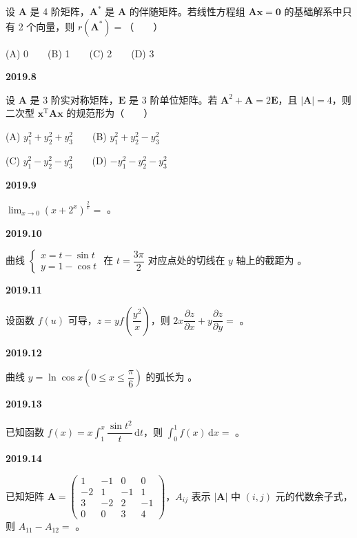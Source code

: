 \documentclass[UTF8,12pt,fontset=windows]{ctexart}
\begin{document}
设 $\boldsymbol{A}$ 是 4 阶矩阵，$\boldsymbol{A}^*$ 是 $\boldsymbol{A}$ 的伴随矩阵。若线性方程组 $\boldsymbol{A}\boldsymbol{x} = \boldsymbol{0}$ 的基础解系中只有 2 个向量，则 $r(\boldsymbol{A}^*) =$（　　）

(A) 0　　(B) 1　　(C) 2　　(D) 3

\vfill
\newpage
{\large\bfseries 2019.8}

设 $\boldsymbol{A}$ 是 3 阶实对称矩阵，$\boldsymbol{E}$ 是 3 阶单位矩阵。若 $\boldsymbol{A}^2 + \boldsymbol{A} = 2\boldsymbol{E}$，且 $|\boldsymbol{A}| = 4$，则二次型 $\boldsymbol{x}^{\mathrm{T}}\boldsymbol{A}\boldsymbol{x}$ 的规范形为（　　）

(A) $y_1^2 + y_2^2 + y_3^2$　　(B) $y_1^2 + y_2^2 - y_3^2$

(C) $y_1^2 - y_2^2 - y_3^2$　　(D) $-y_1^2 - y_2^2 - y_3^2$

\vfill
\newpage
{\large\bfseries 2019.9}

$\lim_{x\to 0} (x + 2^x)^{\frac{2}{x}} =$ \underline{\hspace{20mm}}。

\vfill
\newpage
{\large\bfseries 2019.10}

曲线 $\begin{cases} x = t - \sin t \\ y = 1 - \cos t \end{cases}$ 在 $t = \dfrac{3\pi}{2}$ 对应点处的切线在 $y$ 轴上的截距为 \underline{\hspace{20mm}}。

\vfill
\newpage
{\large\bfseries 2019.11}

设函数 $f(u)$ 可导，$z = yf\left(\dfrac{y^2}{x}\right)$，则 $2x\dfrac{\partial z}{\partial x} + y\dfrac{\partial z}{\partial y} =$ \underline{\hspace{20mm}}。

\vfill
\newpage
{\large\bfseries 2019.12}

曲线 $y = \ln\cos x \left(0 \leqslant x \leqslant \dfrac{\pi}{6}\right)$ 的弧长为 \underline{\hspace{20mm}}。

\vfill
\newpage
{\large\bfseries 2019.13}

已知函数 $f(x) = x\int_{1}^{x} \dfrac{\sin t^2}{t}\,\mathrm{d}t$，则 $\int_{0}^{1} f(x)\,\mathrm{d}x =$ \underline{\hspace{20mm}}。

\vfill
\newpage
{\large\bfseries 2019.14}

已知矩阵 $\boldsymbol{A} = \begin{pmatrix} 1 & -1 & 0 & 0 \\ -2 & 1 & -1 & 1 \\ 3 & -2 & 2 & -1 \\ 0 & 0 & 3 & 4 \end{pmatrix}$，$A_{ij}$ 表示 $|\boldsymbol{A}|$ 中 $(i,j)$ 元的代数余子式，则 $A_{11} - A_{12} =$ \underline{\hspace{20mm}}。
\end{document}
